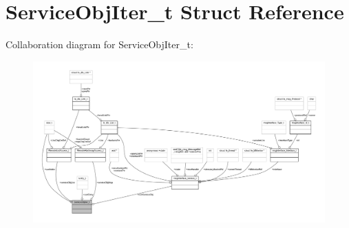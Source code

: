 \hypertarget{struct_service_obj_iter__t}{}\section{Service\+Obj\+Iter\+\_\+t Struct Reference}
\label{struct_service_obj_iter__t}


Collaboration diagram for Service\+Obj\+Iter\+\_\+t\+:
\nopagebreak
\begin{figure}[H]
\begin{center}
\leavevmode
\includegraphics[width=350pt]{struct_service_obj_iter__t__coll__graph}
\end{center}
\end{figure}
